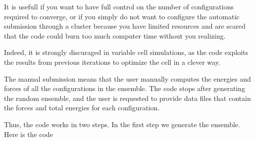 \documentclass[a4paper,11pt,english]{sphinxmanual}
\begin{document}
\sphinxAtStartPar
It is usefull if you want to have full control on the number of configurations required to converge, or if you simply do not want to configure the automatic submission through a cluster because you have limited resources and are scared that the code could burn too much computer time without you realizing.

\sphinxAtStartPar
Indeed, it is strongly discuraged in variable cell simulations, as the code exploits the results from previous iterations to optimize the cell in a clever way.

\sphinxAtStartPar
The manual submission means that the user manually computes the energies and forces of all the configurations in the ensemble. The code stops after generating the random ensemble, and the user is requested to provide data files that contain the forces and total energies for each configuration.

\sphinxAtStartPar
Thus, the code works in two steps.
In the first step we generate the ensemble. Here is the code

\begin{sphinxVerbatim}[commandchars=\\\{\}]
   
    

     


   
   

  

   
\end{sphinxVerbatim}
\end{document}
